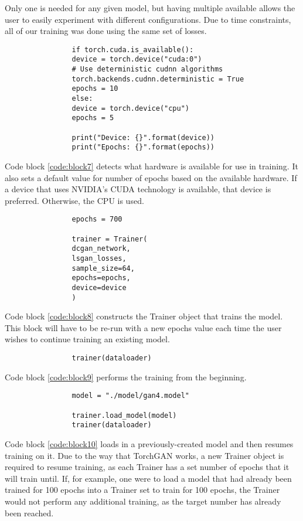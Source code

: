 \documentclass[11pt,letterpaper]{article}
\newenvironment{code}{\captionsetup{type=listing}}{}
\begin{document}
		Only one is needed for any given model, but having multiple available allows the user to easily experiment with different configurations.
		Due to time constraints, all of our training was done using the same set of losses.
		\begin{code}
			\caption{}
			\begin{verbatim}
				if torch.cuda.is_available():
				device = torch.device("cuda:0")
				# Use deterministic cudnn algorithms
				torch.backends.cudnn.deterministic = True
				epochs = 10
				else:
				device = torch.device("cpu")
				epochs = 5

				print("Device: {}".format(device))
				print("Epochs: {}".format(epochs))
			\end{verbatim}
			\label{code:block7}
		\end{code}
		Code block \ref{code:block7} detects what hardware is available for use in training.
		It also sets a default value for number of epochs based on the available hardware.
		If a device that uses NVIDIA's CUDA technology is available, that device is preferred.
		Otherwise, the CPU is used.
		\begin{code}
			\caption{}
			\begin{verbatim}
				epochs = 700

				trainer = Trainer(
				dcgan_network,
				lsgan_losses,
				sample_size=64,
				epochs=epochs,
				device=device
				)
			\end{verbatim}
			\label{code:block8}
		\end{code}
		Code block \ref{code:block8} constructs the Trainer object that trains the model.
		This block will have to be re-run with a new epochs value each time the user wishes to continue training an existing model.
		\begin{code}
			\caption{}
			\begin{verbatim}
				trainer(dataloader)
			\end{verbatim}
			\label{code:block9}
		\end{code}
		Code block \ref{code:block9} performs the training from the beginning.
		\begin{code}
			\caption{}
			\begin{verbatim}
				model = "./model/gan4.model"

				trainer.load_model(model)
				trainer(dataloader)
			\end{verbatim}
			\label{code:block10}
		\end{code}
		Code block \ref{code:block10} loads in a previously-created model and then resumes training on it.
		Due to the way that TorchGAN works, a new Trainer object is required to resume training, as each Trainer has a set number of epochs that it will train until.
		If, for example, one were to load a model that had already been trained for 100 epochs into a Trainer set to train for 100 epochs, the Trainer would not perform any additional training, as the target number has already been reached.
\end{document}
